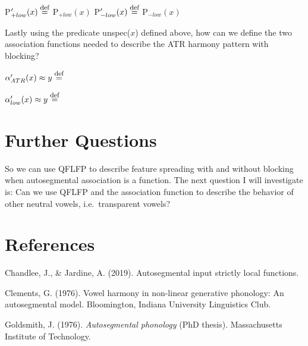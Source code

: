 \documentclass[,doc,floatsintext]{apa6}
\def\defeq{\mathrel{\buildrel \mbox{\footnotesize def} \over =}}
\theoremstyle{definition}
\theoremstyle{definition}
\theoremstyle{definition}
\theoremstyle{remark}
\begin{document}
P\('_{+low}(x) \defeq\) P\(_{+low}(x)\) \hspace{2in}
P\('_{-low}(x) \defeq\) P\(_{-low}(x)\)

\newpage

\noindent Lastly using the predicate unspec(\(x\)) defined above, how
can we define the two association functions needed to describe the ATR
harmony pattern with blocking?

\noindent \(\alpha_{ATR}'(x)\approx y \defeq\) \vspace{1in}

\noindent \(\alpha_{low}'(x)\approx y \defeq\) \vspace{1in}

\section{Further Questions}\label{further-questions}

So we can use QFLFP to describe feature spreading with and without
blocking when autosegmental association is a function. The next question
I will investigate is: Can we use QFLFP and the association function to
describe the behavior of other neutral vowels, i.e.~transparent vowels?
\vspace{2.5in}

\section{References}\label{references}

\begingroup
\setlength{\parindent}{-0.5in} \setlength{\leftskip}{0.5in}

\hypertarget{refs}{}
\hypertarget{ref-chandleejardineaisl}{}
Chandlee, J., \& Jardine, A. (2019). Autosegmental input strictly local
functions.

\hypertarget{ref-Clements1976}{}
Clements, G. (1976). Vowel harmony in non-linear generative phonology:
An autosegmental model. Bloomington, Indiana University Linguistics
Club.

\hypertarget{ref-Goldsmith1976}{}
Goldsmith, J. (1976). \emph{Autosegmental phonology} (PhD thesis).
Massachusetts Institute of Technology.

\endgroup
\end{document}
